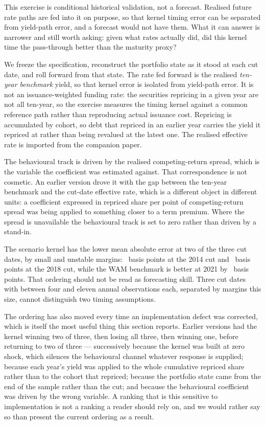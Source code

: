 \documentclass[11pt,a4paper]{article}
\begin{document}
This exercise is conditional historical validation, not a forecast. Realised
future rate paths are fed into it on purpose, so that kernel timing error can
be separated from yield-path error, and a forecast would not have them. What it
can answer is narrower and still worth asking: given what rates actually did,
did this kernel time the pass-through better than the maturity proxy?

We freeze the specification, reconstruct the portfolio state as it stood at
each cut date, and roll forward from that state. The rate fed forward is the
realised \emph{ten-year benchmark} yield, so that kernel error is isolated from
yield-path error. It is not an issuance-weighted funding rate: the securities
repricing in a given year are not all ten-year, so the exercise measures the
timing kernel against a common reference path rather than reproducing actual
issuance cost. Repricing is accumulated by cohort, so debt that repriced in an
earlier year carries the yield it repriced at rather than being revalued at the
latest one. The realised effective rate is imported from the companion paper.

The behavioural track is driven by the realised competing-return spread, which
is the variable the coefficient was estimated against. That correspondence is
not cosmetic. An earlier version drove it with the gap between the ten-year
benchmark and the cut-date effective rate, which is a different object in
different units: a coefficient expressed in repriced share per point of
competing-return spread was being applied to something closer to a term
premium. Where the spread is unavailable the behavioural track is set to zero
rather than driven by a stand-in.





The scenario kernel has the lower mean absolute error at two of the three cut
dates, by small and unstable margins: \BacktestMarginFourteen\ basis points at
the 2014 cut and \BacktestMarginEighteen\ basis points at the 2018 cut, while
the WAM benchmark is better at 2021 by \BacktestMarginTwentyOne\ basis points.
That ordering should not be read as forecasting skill. Three cut dates with
between four and eleven annual observations each, separated by margins this
size, cannot distinguish two timing assumptions.

The ordering has also moved every time an implementation defect was corrected,
which is itself the most useful thing this section reports. Earlier versions
had the kernel winning two of three, then losing all three, then winning one,
before returning to two of three --- successively because the kernel was built at zero
shock, which silences the behavioural channel whatever response is supplied;
because each year's yield was applied to the whole cumulative repriced share
rather than to the cohort that repriced; because the portfolio state came from
the end of the sample rather than the cut; and because the behavioural
coefficient was driven by the wrong variable. A ranking that is this sensitive
to implementation is not a ranking a reader should rely on, and we would rather
say so than present the current ordering as a result.
\end{document}
